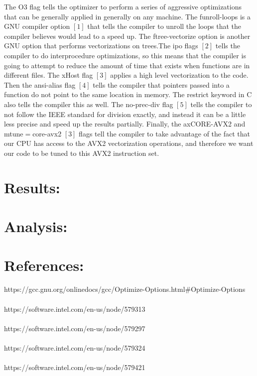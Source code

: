 \documentclass{article}
\begin{document}
The O3 flag tells the optimizer to perform a series of aggressive optimizations that can be generally applied in generally on any machine. The funroll-loops is a GNU compiler option $[1]$ that tells the compiler to unroll the loops that the compiler believes would lead to a speed up. The ftree-vectorize option is another GNU option that performs vectorizations on trees.The ipo flags $[2]$ tells the compiler to do interprocedure optimizations, so this means that the compiler is going to attempt to reduce the amount of time that exists when functions are in different files. The xHost flag $[3]$ applies a high level vectorization to the code. Then the ansi-alias flag $[4]$ tells the compiler that pointers passed into a function do not point to the same location in memory. The restrict keyword in C also tells the compiler this as well. The no-prec-div flag $[5]$ tells the compiler to not follow the IEEE standard for division exactly, and instead it can be a little less precise and speed up the results partially. Finally, the axCORE-AVX2  and mtune$=$core-avx2 $[3]$ flags tell the compiler to take advantage of the fact that our CPU has access to the AVX2 vectorization operations, and therefore we want our code to be tuned to this AVX2 instruction set. 

\section*{Results:}



\section*{Analysis:}

\section*{References:}

\noindent [1]  https://gcc.gnu.org/onlinedocs/gcc/Optimize-Options.html\#Optimize-Options \\  \\
\noindent [2] https://software.intel.com/en-us/node/579313 \\ \\
\noindent [3] https://software.intel.com/en-us/node/579297 \\ \\
\noindent [4] https://software.intel.com/en-us/node/579324 \\ \\
\noindent [5] https://software.intel.com/en-us/node/579421 \\ \\
\end{document}
